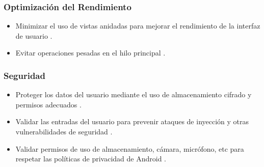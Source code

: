 \subsubsection{Optimización del Rendimiento}
\begin{itemize}
    \item Minimizar el uso de vistas anidadas para mejorar el rendimiento de la interfaz de usuario \cite{PhillipsStewart2022}.
    \item Evitar operaciones pesadas en el hilo principal \cite{PhillipsStewart2022}.
\end{itemize}

\subsubsection{Seguridad}
\begin{itemize}
    \item Proteger los datos del usuario mediante el uso de almacenamiento cifrado y permisos adecuados \cite{PhillipsStewart2022}.
    \item Validar las entradas del usuario para prevenir ataques de inyección y otras vulnerabilidades de seguridad \cite{PhillipsStewart2022}.
    \item Validar permisos de uso de almacenamiento, cámara, micrófono, etc para respetar las políticas de privacidad de Android \cite{PhillipsStewart2022}.
\end{itemize}

